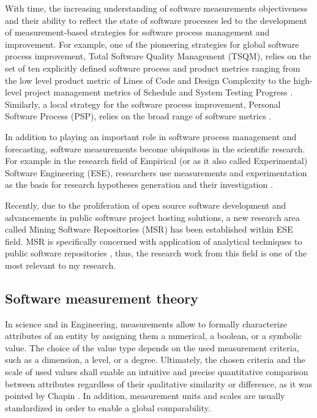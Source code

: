 With time, the increasing understanding of software measurements objectiveness and their ability to reflect 
the state of software processes led to the development of measurement-based strategies for software 
process management and improvement. 
For example, one of the pioneering strategies for global software process improvement, 
Total Software Quality Management (TSQM), relies on the set of ten explicitly defined software 
process and product metrics ranging from the low level product metric of Lines of Code and Design Complexity to 
the high-level project management metrics of Schedule and System Testing Progress \cite{citeulike:13071448}.
Similarly, a local strategy for the software process improvement, Personal Software Process (PSP), relies on 
the broad range of software metrics \cite{citeulike:13072239}.

In addition to playing an important role in software process management and forecasting, software 
measurements become ubiquitous in the scientific research. 
For example in the research field of Empirical (or as it also called Experimental) Software Engineering (ESE), 
researchers use measurements and experimentation as the basis for research hypotheses 
generation and their investigation \cite{citeulike:766768}. 

Recently, due to the proliferation of open source software development and advancements in public software
project hosting solutions, a new research area called Mining Software Repositories (MSR) has been established 
within ESE field. MSR is specifically concerned with application of analytical techniques to public software 
repositories \cite{citeulike:12550438} \cite{citeulike:4534888} \cite{citeulike:2710928}, thus, 
the research work from this field is one of the most relevant to my research.

\subsection{Software measurement theory}
In science and in Engineering, measurements allow to formally characterize attributes of an entity by assigning 
them a numerical, a boolean, or a symbolic value. 
The choice of the value type depends on the used measurement criteria, such as a dimension, a level, 
or a degree. Ultimately, the chosen criteria and the scale of used values shall enable an intuitive 
and precise quantitative comparison between attributes regardless of their qualitative similarity or 
difference, as it was pointed by Chapin \cite{citeulike:13158806}. 
In addition, measurement units and scales are usually standardized in order to enable a global comparability.

